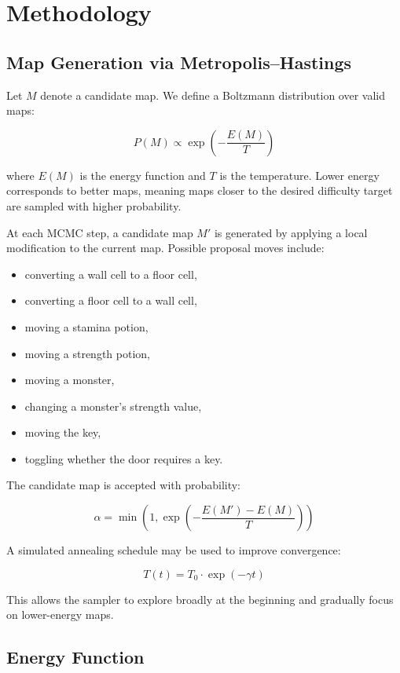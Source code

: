 \documentclass[11pt]{article}
\begin{document}
\section{Methodology}

\subsection{Map Generation via Metropolis--Hastings}

Let $M$ denote a candidate map. We define a Boltzmann distribution over valid maps:

\[
P(M) \propto \exp \left( -\frac{E(M)}{T} \right)
\]

where $E(M)$ is the energy function and $T$ is the temperature. Lower energy corresponds to better maps, meaning maps closer to the desired difficulty target are sampled with higher probability.

At each MCMC step, a candidate map $M'$ is generated by applying a local modification to the current map. Possible proposal moves include:

\begin{itemize}[noitemsep]
    \item converting a wall cell to a floor cell,
    \item converting a floor cell to a wall cell,
    \item moving a stamina potion,
    \item moving a strength potion,
    \item moving a monster,
    \item changing a monster's strength value,
    \item moving the key,
    \item toggling whether the door requires a key.
\end{itemize}

The candidate map is accepted with probability:

\[
\alpha = \min \left(1, \exp \left( -\frac{E(M') - E(M)}{T} \right) \right)
\]

A simulated annealing schedule may be used to improve convergence:

\[
T(t) = T_0 \cdot \exp(-\gamma t)
\]

This allows the sampler to explore broadly at the beginning and gradually focus on lower-energy maps.

\subsection{Energy Function}
\end{document}
